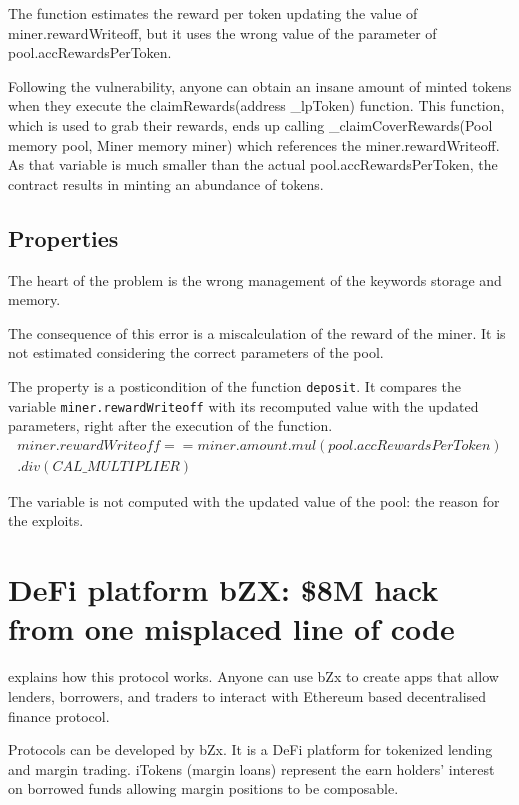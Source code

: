 The function estimates the reward per token updating the value of miner.rewardWriteoff, 
but it uses the wrong value of the parameter of pool.accRewardsPerToken.

Following the vulnerability, anyone can obtain an insane amount of minted tokens when they execute the claimRewards(address \_lpToken) function. 
This function, which is used to grab their rewards, ends up calling \_claimCoverRewards(Pool memory pool, Miner memory miner) 
which references the miner.rewardWriteoff. 
As that variable is much smaller than the actual pool.accRewardsPerToken, the contract results in minting an abundance of tokens.

\subsection{Properties}
The heart of the problem is the wrong management of the keywords storage and memory. 

The consequence of this error is a miscalculation of the reward of the miner.
It is not estimated considering the correct parameters of the pool. 

The property is a posticondition of the function \texttt{deposit}. It compares the variable \texttt{miner.rewardWriteoff} with its recomputed value with the updated parameters, 
right after the execution of the function. 
\begin{equation}
    \begin{split}
    miner.rewardWriteoff == miner.amount.mul(pool.accRewardsPerToken) \\ .div(CAL\_MULTIPLIER)
    \end{split}
\end{equation}

The variable is not computed with the updated value of the pool: the reason for the exploits.

\section{DeFi platform bZX: \$8M hack from one misplaced line of code}
\label{sec:Exploits:bZX}

\citet{bZxProtocol} explains how this protocol works. 
Anyone can use bZx to create apps that allow lenders, borrowers, and traders to interact with Ethereum based 
decentralised finance protocol.

Protocols can be developed by bZx. 
It is a DeFi platform for tokenized lending and margin trading. 
iTokens (margin loans) represent the earn holders' interest on borrowed funds allowing margin positions to be composable.

